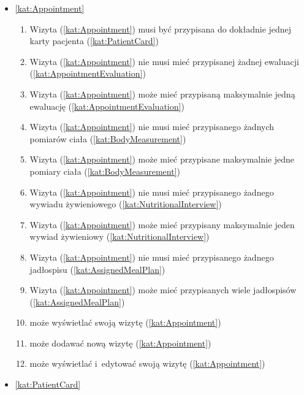 \begin{itemize}[label={\textbf{Reguły dla}}, wide, labelwidth=!, labelindent=0pt]
    \setlength\itemsep{1.75em}
    \item\ref{kat:Appointment}\mynobreakpar
    \begin{enumerate}[label={\textbf{REG/4/\protect\twodigits{\arabic{enumi}}}}, wide, labelwidth=!, align=left, leftmargin=3cm]
        \item Wizyta (\ref{kat:Appointment}) musi być przypisana do dokładnie jednej karty pacjenta (\ref{kat:PatientCard})
        \item Wizyta (\ref{kat:Appointment}) nie musi mieć przypisanej żadnej ewaluacji (\ref{kat:AppointmentEvaluation})
        \item Wizyta (\ref{kat:Appointment}) może mieć przypisaną maksymalnie jedną ewaluację (\ref{kat:AppointmentEvaluation})
        \item Wizyta (\ref{kat:Appointment}) nie musi mieć przypisanego żadnych pomiarów ciała (\ref{kat:BodyMeasurement})
        \item Wizyta (\ref{kat:Appointment}) może mieć przypisane maksymalnie jedne pomiary ciała (\ref{kat:BodyMeasurement})
        \item Wizyta (\ref{kat:Appointment}) nie musi mieć przypisanego żadnego wywiadu żywieniowego (\ref{kat:NutritionalInterview})
        \item Wizyta (\ref{kat:Appointment}) może mieć przypisany maksymalnie jeden wywiad żywieniowy (\ref{kat:NutritionalInterview})
        \item Wizyta (\ref{kat:Appointment}) nie musi mieć przypisanego żadnego jadłospisu (\ref{kat:AssignedMealPlan})
        \item Wizyta (\ref{kat:Appointment}) może mieć przypisanych wiele jadłospisów (\ref{kat:AssignedMealPlan})
        \item {} może wyświetlać swoją wizytę (\ref{kat:Appointment})
        \item {} może dodawać nową wizytę (\ref{kat:Appointment})
        \item {} może wyświetlać i~edytować swoją wizytę (\ref{kat:Appointment})
    \end{enumerate}
    \item\ref{kat:PatientCard}\mynobreakpar
    \begin{enumerate}[label={\textbf{REG/4/\protect\twodigits{\arabic{enumi}}}}, wide, labelwidth=!, align=left, leftmargin=3cm, resume]

\end{enumerate}
\end{itemize}
